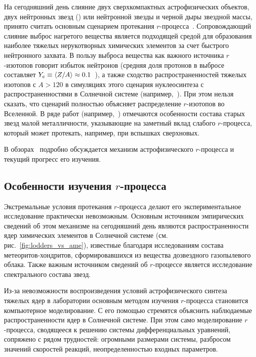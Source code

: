 На сегодняшний день слияние двух сверхкомпактных астрофизических объектов, двух нейтронных звезд (\nsm{}) или нейтронной звезды и черной дыры звездной массы, принято считать основным сценарием протекания $r$-процесса~\cite{theilemann2017}. Сопровождающий слияние выброс нагретого вещества является подходящей средой для образования наиболее тяжелых нерукотворных химических элементов за счет быстрого нейтронного захвата. В пользу выброса вещества \nsm{} как важного источника $r$-изотопов говорит избыток нейтронов (средняя доля протонов в выбросе составляет $Y_e \equiv \expval{Z/A} \approx 0.1$~\cite{kajino2019}), а также сходство распространенностей тяжелых изотопов с $A > 120$ в симуляциях этого сценария нуклеосинтеза с распространенностями в Солнечной системе (например,~\cite{freiberghaus1999,goriely2011}). При этом нельзя сказать, что сценарий \nsm{} полностью объясняет распределение $r$-изотопов во Вселенной. В ряде работ (например,~\cite{honda2006,qian2007,hansen2014}) отмечаются особенности состава старых звезд малой металличности, указывающие на заметный вклад слабого $r$-процесса, который может протекать, например, при вспышках сверхновых.  

В обзорах~\cite{arnould2007,kajino2019,cowan2021} подробно обсуждается механизм астрофизического $r$-процесса и текущий прогресс его изучения.

\subsection{Особенности изучения $r$-процесса}
Экстремальные условия протекания $r$-процесса делают его экспериментальное исследование практически невозможным. Основным источником эмпирических сведений об этом механизме на сегодняшний день являются распространенности ядер химических элементов в Солнечной системе (см. рис.~\ref{fig:lodders_vs_ame}), известные благодаря исследованиям состава метеоритов-хондритов, сформировавшихся из вещества дозвездного газопылевого облака. Также важным источником сведений об $r$-процессе является исследование спектрального состава звезд.

Из-за невозможности воспроизведения условий астрофизического синтеза тяжелых ядер в лаборатории основным методом изучения $r$-процесса становится компьютерное моделирование. С его помощью стремятся объяснить наблюдаемые распространенности ядер в Солнечной системе. При этом само моделирование $r$-процесса, сводящееся к решению системы дифференциальных уравнений, сопряжено с рядом трудностей: огромными размерами системы, разбросом значений скоростей реакций, неопределенностью входных параметров.

